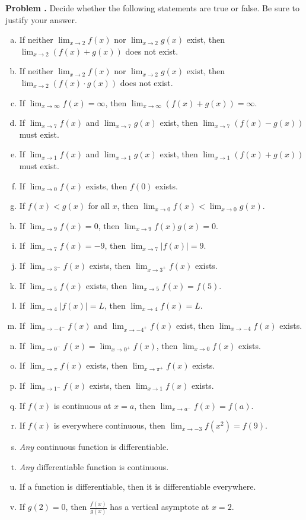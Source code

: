 \documentclass[11pt,letterpaper]{article}
\newcommand{\ds}{\displaystyle}
\newcounter{problem}
\newcommand{\prob}{\stepcounter{problem}%
\noindent\textbf{Problem \theproblem. }}
\begin{document}
\prob Decide whether the following statements are true or false. Be sure to justify your answer.
	\begin{enumerate}[(a)]
	\item If neither $\ds\lim_{x \to 2} f(x)$ nor $\ds\lim_{x \to 2} g(x)$ exist, then $\ds\lim_{x \to 2} \left( f(x) + g(x) \right)$ does not exist. 
	\item If neither $\ds\lim_{x \to 2} f(x)$ nor $\ds\lim_{x \to 2} g(x)$ exist, then $\ds\lim_{x \to 2} \left( f(x) \cdot g(x) \right)$ does not exist. 
	\item If $\ds\lim_{x \to \infty} f(x)= \infty$, then $\ds\lim_{x \to \infty} \left( f(x) + g(x) \right)= \infty$.
	\item If $\ds\lim_{x \to 7} f(x)$ and $\ds\lim_{x \to 7} g(x)$ exist, then $\ds\lim_{x \to 7} \left( f(x) - g(x) \right)$ must exist. 
	\item If $\ds\lim_{x \to 1} f(x)$ and $\ds\lim_{x \to 1} g(x)$ exist, then $\ds\lim_{x \to 1} \left( f(x) + g(x) \right)$ must exist. 
	\item If $\ds\lim_{x \to 0} f(x)$ exists, then $f(0)$ exists. 
	\item If $f(x) < g(x)$ for all $x$, then $\ds\lim_{x \to 0} f(x) < \lim_{x \to 0} g(x)$. 
	\item If $\ds\lim_{x \to 9} f(x)= 0$, then $\ds\lim_{x \to 9} f(x) g(x)= 0$. 
	\item If $\ds\lim_{x \to 7} f(x)= -9$, then $\ds\lim_{x \to 7} |f(x)|= 9$. 
	\item If $\ds\lim_{x \to 3^-} f(x)$ exists, then $\ds\lim_{x \to 3^+} f(x)$ exists. 	
	\item If $\ds\lim_{x \to 5} f(x)$ exists, then $\ds\lim_{x \to 5} f(x)= f(5)$. 
	\item If $\ds\lim_{x \to 4} |f(x)|= L$, then $\ds\lim_{x \to 4} f(x)= L$. 
	\item If $\ds\lim_{x \to -4^-} f(x)$ and $\ds\lim_{x \to -4^+} f(x)$ exist, then $\ds\lim_{x \to -4} f(x)$ exists.
	\item If $\ds\lim_{x \to 0^-} f(x)= \ds\lim_{x \to 0^+} f(x)$, then $\ds\lim_{x \to 0} f(x)$ exists. 
	\item If $\ds\lim_{x \to \pi} f(x)$ exists, then $\ds\lim_{x \to \pi^+} f(x)$ exists. 
	\item If $\ds\lim_{x \to 1^-} f(x)$ exists, then $\ds\lim_{x \to 1} f(x)$ exists. 
	\item If $f(x)$ is continuous at $x= a$, then $\ds\lim_{x \to a^-} f(x)= f(a)$. 
	\item If $f(x)$ is everywhere continuous, then $\ds\lim_{x \to -3} f(x^2)= f(9)$.
	\item \textit{Any} continuous function is differentiable.
	\item \textit{Any} differentiable function is continuous. 
	\item If a function is differentiable, then it is differentiable everywhere. 
	\item If $g(2)= 0$, then $\frac{f(x)}{g(x)}$ has a vertical asymptote at $x= 2$. 
	\end{enumerate}
\end{document}

